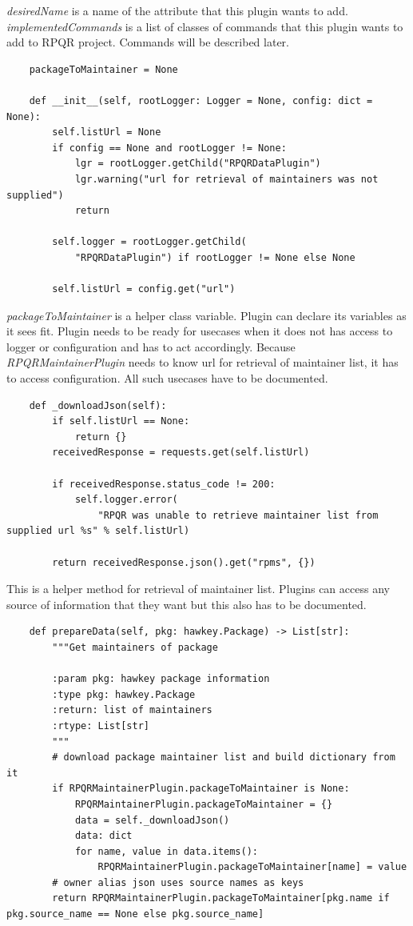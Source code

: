 \textit{desiredName} is a name of the attribute that this plugin wants to add. \textit{implementedCommands}
is a list of classes of commands that this plugin wants to add to RPQR project. Commands will be described
later.

\begin{lstlisting}
    packageToMaintainer = None

    def __init__(self, rootLogger: Logger = None, config: dict = None):
        self.listUrl = None
        if config == None and rootLogger != None:
            lgr = rootLogger.getChild("RPQRDataPlugin")
            lgr.warning("url for retrieval of maintainers was not supplied")
            return

        self.logger = rootLogger.getChild(
            "RPQRDataPlugin") if rootLogger != None else None

        self.listUrl = config.get("url")
\end{lstlisting}

\textit{packageToMaintainer} is a helper class variable. Plugin can declare its variables as it sees
fit. Plugin needs to be ready for usecases when it does not has access to logger or configuration
and has to act accordingly. Because \textit{RPQRMaintainerPlugin} needs to know url for retrieval
of maintainer list, it has to access configuration. All such usecases have to be documented.

\newpage

\begin{lstlisting}
    def _downloadJson(self):
        if self.listUrl == None:
            return {}
        receivedResponse = requests.get(self.listUrl)

        if receivedResponse.status_code != 200:
            self.logger.error(
                "RPQR was unable to retrieve maintainer list from supplied url %s" % self.listUrl)

        return receivedResponse.json().get("rpms", {})
\end{lstlisting}

This is a helper method for retrieval of maintainer list. Plugins can access any source of information
that they want but this also has to be documented.

\begin{lstlisting}
    def prepareData(self, pkg: hawkey.Package) -> List[str]:
        """Get maintainers of package

        :param pkg: hawkey package information
        :type pkg: hawkey.Package
        :return: list of maintainers
        :rtype: List[str]
        """
        # download package maintainer list and build dictionary from it
        if RPQRMaintainerPlugin.packageToMaintainer is None:
            RPQRMaintainerPlugin.packageToMaintainer = {}
            data = self._downloadJson()
            data: dict
            for name, value in data.items():
                RPQRMaintainerPlugin.packageToMaintainer[name] = value
        # owner alias json uses source names as keys
        return RPQRMaintainerPlugin.packageToMaintainer[pkg.name if pkg.source_name == None else pkg.source_name]
\end{lstlisting}

